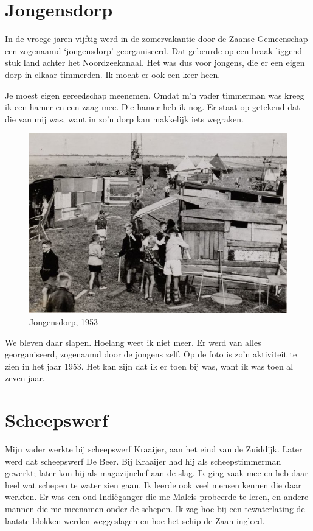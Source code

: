 \documentclass[12pt,twoside, openright]{memoir}
\newlength{\drop}%
\begin{document}
\section*{Jongensdorp} %
\label{cha:jongensdrop}

In de vroege jaren vijftig werd in de zomervakantie door de Zaanse Gemeenschap een zogenaamd `jongensdorp' georganiseerd. Dat gebeurde op een braak liggend stuk land achter het Noordzeekanaal. Het was dus voor jongens, die er een eigen dorp in elkaar timmerden. Ik mocht er ook een keer heen. 

Je moest eigen gereedschap meenemen. Omdat m’n vader timmerman was kreeg ik een hamer en een zaag mee. Die hamer heb ik nog. Er staat op getekend dat die van mij was, want in zo’n dorp kan makkelijk iets wegraken. 

\begin{figure}
\centering
\includegraphics[width=\textwidth]{img/87-88jongensdorp}
\caption*{\footnotesize Jongensdorp, 1953}
\end{figure}

We bleven daar slapen. Hoelang weet ik niet meer. Er werd van alles georganiseerd, zogenaamd door de jongens zelf. Op de foto is zo’n aktiviteit te zien in het jaar 1953. Het kan zijn dat ik er toen bij was, want ik was toen al zeven jaar.

\section*{Scheepswerf} %
\label{cha:scheepswerf}

Mijn vader werkte bij scheepswerf Kraaijer, aan het eind van de Zuiddijk. Later werd dat scheepswerf De Beer. Bij Kraaijer had hij als scheepstimmerman gewerkt; later kon hij als magazijnchef aan de slag. Ik ging vaak mee en heb daar heel wat schepen te water zien gaan. Ik leerde ook veel mensen kennen die daar werkten. Er was een oud-Indiëganger die me Maleis probeerde te leren, en andere mannen die me meenamen onder de schepen. Ik zag hoe bij een tewaterlating de laatste blokken werden weggeslagen en hoe het schip de Zaan ingleed. 
\end{document}
